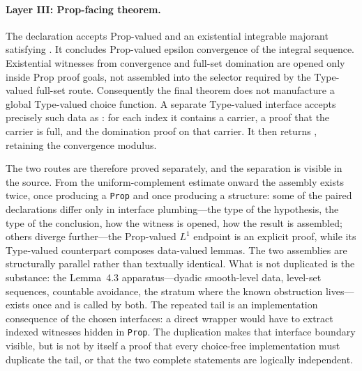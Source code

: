 \documentclass[11pt]{article}
\theoremstyle{definition}
\theoremstyle{remark}
\begin{document}
\paragraph{Layer III: Prop-facing theorem.}
The declaration  accepts Prop-valued  and an existential integrable majorant satisfying .  It concludes Prop-valued epsilon convergence of the integral sequence.  Existential witnesses from convergence and full-set domination are opened only inside Prop proof goals, not assembled into the selector required by the Type-valued full-set route.  Consequently the final theorem does not manufacture a global Type-valued choice function.  A separate Type-valued interface accepts precisely such data as : for each index it contains a carrier, a proof that the carrier is full, and the domination proof on that carrier.  It then returns , retaining the convergence modulus.

The two routes are therefore proved separately, and the separation is visible in the source.  From the uniform-complement estimate onward the assembly exists twice, once producing a \texttt{Prop} and once producing a structure: some of the paired declarations differ only in interface plumbing---the type of the hypothesis, the type of the conclusion, how the witness is opened, how the result is assembled; others diverge further---the Prop-valued $L^1$ endpoint is an explicit proof, while its Type-valued counterpart composes data-valued lemmas.  The two assemblies are structurally parallel rather than textually identical.  What is not duplicated is the substance: the Lemma~4.3 apparatus---dyadic smooth-level data, level-set sequences, countable avoidance, the stratum where the known obstruction lives---exists once and is called by both.  The repeated tail is an implementation consequence of the chosen interfaces: a direct wrapper would have to extract indexed witnesses hidden in \texttt{Prop}.  The duplication makes that interface boundary visible, but is not by itself a proof that every choice-free implementation must duplicate the tail, or that the two complete statements are logically independent.
\end{document}

